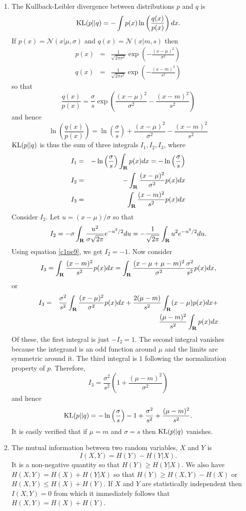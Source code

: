 \begin{enumerate}
\item The Kullback-Leibler divergence between distributions $p$ and $q$ is
\[
\operatorname{KL}(p || q) = -\int p(x)\ln\left(\frac{q(x)}{p(x)}\right)dx.
\]
If $p(x) = \mathcal{N}(x|\mu,\sigma)$ and $q(x) = \mathcal{N}(x|m, s)$ then
\begin{eqnarray*}
p(x) &=& \frac{1}{\sqrt{2\pi\sigma^2}}\exp\left(-\frac{(x - \mu)^2}{\sigma^2}\right) \\
q(x) &=& \frac{1}{\sqrt{2\pi s^2}}\exp\left(-\frac{(x - m)^2}{s^2}\right)
\end{eqnarray*}
so that
\[
\frac{q(x)}{p(x)} = \frac{\sigma}{s}\exp\left(\frac{(x - \mu)^2}{\sigma^2} - \frac{(x - m)^2}{s^2}\right)
\]
and hence
\[
\ln\left(\frac{q(x)}{p(x)}\right) = \ln\left(\frac{\sigma}{s}\right) + \frac{(x - \mu)^2}{\sigma^2} - \frac{(x - m)^2}{s^2}
\]
$\operatorname{KL}(p||q)$ is thus the sum of three integrals $I_1, I_2, I_3$, where
\begin{eqnarray*}
I_1 &=& -\ln\left(\frac{\sigma}{s}\right)\int_{\mathbf{R}} p(x) dx = -\ln\left(\frac{\sigma}{s}\right) \\
I_2 &=& -\int_{\mathbf{R}} \frac{(x - \mu)^2}{\sigma^2} p(x)dx \\
I_3 &=& \int_{\mathbf{R}} \frac{(x - m)^2}{s^2}p(x)dx
\end{eqnarray*}
Consider $I_2$. Let $u = (x - \mu)/\sigma$ so that 
\[
I_2 = -\sigma\int_{\mathbf{R}} \frac{u^2}{\sigma\sqrt{2\pi}}e^{-u^2/2}du = -\frac{1}{\sqrt{2\pi}}\int_{\mathbf{R}} u^2 e^{-u^2/2}du.
\]
Using equation \eqref{c1pe9}, we get $I_2 = -1$.
Now consider
\[
I_3 = \int_{\mathbf{R}}\frac{(x - m)^2}{s^2}p(x)dx = \int_{\mathbf{R}}\frac{(x - \mu + \mu - m)^2}{\sigma^2}\frac{\sigma^2}{s^2}p(x)dx,
\]
or
\begin{eqnarray*}
I_3 &=& \frac{\sigma^2}{s^2}\int_{\mathbf{R}}\frac{(x - \mu)^2}{\sigma^2}p(x)dx + \frac{2(\mu - m)}{s^2}\int_{\mathbf{R}} (x-\mu)p(x)dx + \\
 & &  \frac{(\mu - m)^2}{s^2}\int_{\mathbf{R}} p(x)dx
\end{eqnarray*}
Of these, the first integral is just $-I_2 = 1$. The second integral vanishes because the integrand
is an odd function around $\mu$ and the limits are symmetric around it. The third integral is $1$ 
following the normalization property of $p$. Therefore,
\[
I_3 = \frac{\sigma^2}{s^2}\left(1 + \frac{(\mu - m)^2}{\sigma^2}\right)
\]
and hence
\[
\operatorname{KL}(p || q) = -\ln\left(\frac{\sigma}{s}\right) - 1 + \frac{\sigma^2}{s^2} + \frac{(\mu - m)^2}{s^2}.
\]
It is easily verified that if $\mu = m$ and $\sigma = s$ then $\operatorname{KL}(p || q)$ vanishes.

\item The mutual information between two random variables, $X$ and $Y$ is
\[
I(X, Y) = H(Y) - H(Y|X).
\]
It is a non-negative quantity so that $H(Y) \ge H(Y|X)$. We also have $H(X, Y) = H(X) + H(Y|X)$
so that $H(Y) \ge H(X, Y) - H(X)$ or $H(X, Y) \le H(X) + H(Y)$. If $X$ and $Y$ are statistically
independent then $I(X, Y) = 0$ from which it immediately follows that $H(X, Y) = H(X) + H(Y)$.


\end{enumerate}
